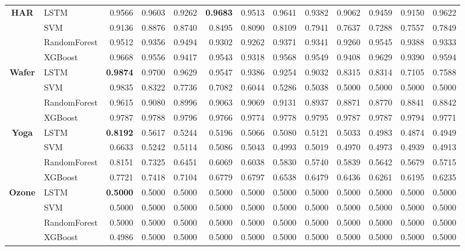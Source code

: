 \begin{table}[h]
\begin{adjustbox}{max width=15cm}
\begin{tabular}{|c|l|r|r|r|r|r|r|r|r|r|r|r|}
	\hline
	\textbf{HAR} & LSTM &  0.9566 &  0.9603 &  0.9262 &  \textbf{0.9683} &  0.9513 &  0.9641 &  0.9382 &  0.9062 &  0.9459 &  0.9150 &  0.9622 \\
	& SVM &  0.9136 &  0.8876 &  0.8740 &  0.8495 &  0.8090 &  0.8109 &  0.7941 &  0.7637 &  0.7288 &  0.7557 &  0.7849 \\
	& RandomForest &  0.9512 &  0.9356 &  0.9494 &  0.9302 &  0.9262 &  0.9371 &  0.9341 &  0.9260 &  0.9545 &  0.9388 &  0.9333 \\
	& XGBoost &  0.9668 &  0.9556 &  0.9417 &  0.9543 &  0.9318 &  0.9568 &  0.9549 &  0.9408 &  0.9629 &  0.9390 &  0.9594 \\
	\hline
	\textbf{Wafer} & LSTM &  \textbf{0.9874} &  0.9700 &  0.9629 &  0.9547 &  0.9386 &  0.9254 &  0.9032 &  0.8315 &  0.8314 &  0.7105 &  0.7588 \\
	& SVM &  0.9835 &  0.8322 &  0.7736 &  0.7082 &  0.6044 &  0.5286 &  0.5038 &  0.5000 &  0.5000 &  0.5000 &  0.5000 \\
	& RandomForest &  0.9615 &  0.9080 &  0.8996 &  0.9063 &  0.9069 &  0.9131 &  0.8937 &  0.8871 &  0.8770 &  0.8841 &  0.8842 \\
	& XGBoost &  0.9787 &  0.9788 &  0.9796 &  0.9766 &  0.9774 &  0.9778 &  0.9795 &  0.9787 &  0.9787 &  0.9794 &  0.9771 \\
	\hline
	\textbf{Yoga} & LSTM &  \textbf{0.8192} &  0.5617 &  0.5244 &  0.5196 &  0.5066 &  0.5080 &  0.5121 &  0.5033 &  0.4983 &  0.4874 &  0.4949 \\
	& SVM &  0.6633 &  0.5242 &  0.5114 &  0.5086 &  0.5043 &  0.4993 &  0.5019 &  0.4970 &  0.4973 &  0.4939 &  0.4913 \\
	& RandomForest &  0.8151 &  0.7325 &  0.6451 &  0.6069 &  0.6038 &  0.5830 &  0.5740 &  0.5839 &  0.5642 &  0.5679 &  0.5715 \\
	& XGBoost &  0.7721 &  0.7418 &  0.7104 &  0.6779 &  0.6797 &  0.6538 &  0.6479 &  0.6436 &  0.6261 &  0.6195 &  0.6235 \\
	\hline
	\textbf{Ozone} & LSTM &  \textbf{0.5000} &  0.5000 &  0.5000 &  0.5000 &  0.5000 &  0.5000 &  0.5000 &  0.5000 &  0.5000 &  0.5000 &  0.5000 \\
	& SVM &  0.5000 &  0.5000 &  0.5000 &  0.5000 &  0.5000 &  0.5000 &  0.5000 &  0.5000 &  0.5000 &  0.5000 &  0.5000 \\
	& RandomForest &  0.5000 &  0.5000 &  0.5000 &  0.5000 &  0.5000 &  0.5000 &  0.5000 &  0.5000 &  0.5000 &  0.5000 &  0.5000 \\
	& XGBoost &  0.4986 &  0.5000 &  0.5000 &  0.5000 &  0.5000 &  0.5000 &  0.5000 &  0.5000 &  0.5000 &  0.5000 &  0.5000 \\

\end{tabular}
\end{adjustbox}
\end{table}
